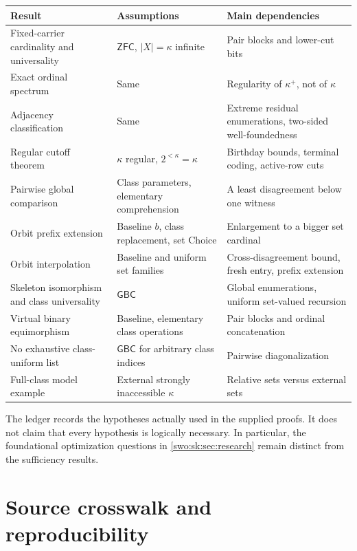\documentclass[11pt]{article}
\theoremstyle{definition}
\theoremstyle{remark}
\newcommand{\GBC}{\mathsf{GBC}}
\newcommand{\ZFC}{\mathsf{ZFC}}
\begin{document}
\begin{center}
\small
\begin{tabularx}{\textwidth}{@{}p{}p{}Y@{}}
\toprule
Result & Assumptions & Main dependencies \\
\midrule
Fixed-carrier cardinality and universality & $\ZFC$, $|X|=\kappa$ infinite & Pair blocks and lower-cut bits \\
Exact ordinal spectrum & Same & Regularity of $\kappa^+$, not of $\kappa$ \\
Adjacency classification & Same & Extreme residual enumerations, two-sided well-foundedness \\
Regular cutoff theorem & $\kappa$ regular, $2^{<\kappa}=\kappa$ & Birthday bounds, terminal coding, active-row cuts \\
Pairwise global comparison & Class parameters, elementary comprehension & A least disagreement below one witness \\
Orbit prefix extension & Baseline $b$, class replacement, set Choice & Enlargement to a bigger set cardinal \\
Orbit interpolation & Baseline and uniform set families & Cross-disagreement bound, fresh entry, prefix extension \\
Skeleton isomorphism and class universality & $\GBC$ & Global enumerations, uniform set-valued recursion \\
Virtual binary equimorphism & Baseline, elementary class operations & Pair blocks and ordinal concatenation \\
No exhaustive class-uniform list & $\GBC$ for arbitrary class indices & Pairwise diagonalization \\
Full-class model example & External strongly inaccessible $\kappa$ & Relative sets versus external sets \\
\bottomrule
\end{tabularx}
\end{center}

The ledger records the hypotheses actually used in the supplied
proofs. It does not claim that every hypothesis is logically necessary.
In particular, the foundational optimization questions in
\cref{swo:sk:sec:research} remain distinct from the sufficiency results.

\appendix

\section{Source crosswalk and reproducibility}\label{swo:app:sources}
\end{document}

